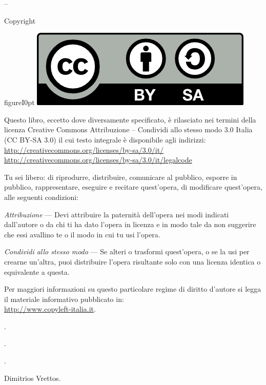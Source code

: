 
\thispagestyle{empty}
{\setlength{\parindent}{0em}\small{
\begin{center}
{\large{\serie – \titolo}}

Copyright {\textcopyright} {\anno} \editore
\end{center}

\begin{wrapfloat}{figure}{I}{0pt}
\includegraphics[width=0.2\columnwidth]{img/by-sa.png}
\end{wrapfloat}

Questo libro, eccetto dove diversamente specificato, è rilasciato nei 
termini della licenza Creative Commons Attribuzione – Condividi allo stesso 
modo 3.0 Italia (CC BY-SA 3.0) il cui testo integrale è disponibile agli 
indirizzi:\\
\url{http://creativecommons.org/licenses/by-sa/3.0/it/}\\
\url{http://creativecommons.org/licenses/by-sa/3.0/it/legalcode}

Tu sei libero:
di riprodurre, distribuire, comunicare al pubblico, esporre in pubblico, 
rappresentare, eseguire e recitare quest'opera, di modificare quest'opera, 
alle seguenti condizioni:

\emph{Attribuzione} --- Devi attribuire la paternità dell'opera nei modi 
indicati dall'autore o da chi ti ha dato l'opera in licenza e in modo tale 
da non suggerire che essi avallino te o il modo in cui tu usi l'opera.

\emph{Condividi allo stesso modo} --- Se alteri o trasformi quest'opera, 
o se la usi per crearne un'altra, puoi distribuire l'opera risultante solo 
con una licenza identica o equivalente a questa.

Per maggiori informazioni su questo particolare regime di diritto d'autore 
si legga il materiale informativo pubblicato in:\\
\url{http://www.copyleft-italia.it}.

 \coord .

 \autori.

 \colab.

 {Dimitrios Vrettos}.

}}
